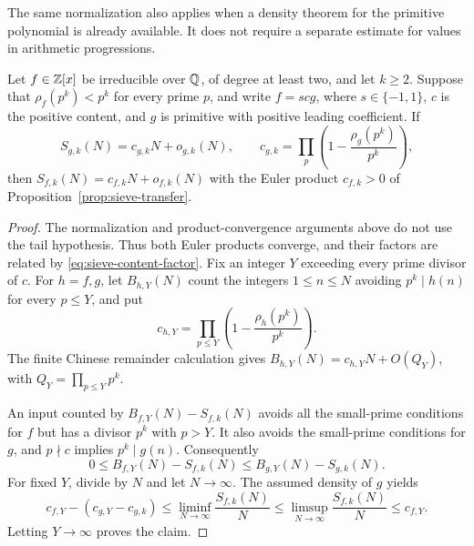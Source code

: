 The same normalization also applies when a density theorem for the
primitive polynomial is already available. It does not require a
separate estimate for values in arithmetic progressions.

\begin{lemma}\label{lem:density-content}
Let $f\in\mathbb Z[x]$ be irreducible over $\mathbb Q$, of degree at least two, and let
$k\ge2$. Suppose that $\rho_f(p^k)<p^k$ for every prime $p$, and write
$f=s c g$, where $s\in\{-1,1\}$, $c$ is the positive content, and $g$ is
primitive with positive leading coefficient. If
\[
 S_{g,k}(N)=c_{g,k}N+o_{g,k}(N),\qquad
 c_{g,k}=\prod_p\left(1-\frac{\rho_g(p^k)}{p^k}\right),
\]
then $S_{f,k}(N)=c_{f,k}N+o_{f,k}(N)$ with the Euler product $c_{f,k}>0$
of Proposition~\ref{prop:sieve-transfer}.
\end{lemma}

\begin{proof}
The normalization and product-convergence arguments above do not use
the tail hypothesis. Thus both Euler products converge, and their
factors are related by \eqref{eq:sieve-content-factor}.
Fix an integer $Y$ exceeding every prime divisor of $c$. For $h=f,g$,
let $B_{h,Y}(N)$ count the integers $1\le n\le N$ avoiding $p^k\mid h(n)$
for every $p\le Y$, and put
\[
 c_{h,Y}=\prod_{p\le Y}\left(1-\frac{\rho_h(p^k)}{p^k}\right).
\]
The finite Chinese remainder calculation gives
$B_{h,Y}(N)=c_{h,Y}N+O(Q_Y)$, with $Q_Y=\prod_{p\le Y}p^k$.

An input counted by $B_{f,Y}(N)-S_{f,k}(N)$ avoids all the small-prime
conditions for $f$ but has a divisor $p^k$ with $p>Y$.
It also avoids the small-prime conditions for $g$, and $p\nmid c$ implies
$p^k\mid g(n)$. Consequently
\[
 0\le B_{f,Y}(N)-S_{f,k}(N)
 \le B_{g,Y}(N)-S_{g,k}(N).
\]
For fixed $Y$, divide by $N$ and let $N\to\infty$. The assumed density
of $g$ yields
\[
 c_{f,Y}-(c_{g,Y}-c_{g,k})
 \le\liminf_{N\to\infty}\frac{S_{f,k}(N)}N
 \le\limsup_{N\to\infty}\frac{S_{f,k}(N)}N
 \le c_{f,Y}.
\]
Letting $Y\to\infty$ proves the claim.
\end{proof}

